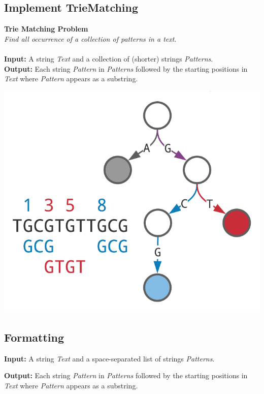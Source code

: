 \documentclass{article}
\begin{document}
\subsection{Implement TrieMatching}
\hline \vspace{5}
\textbf{Trie Matching Problem}\\
\emph{Find all occurrence of a collection of patterns in a text}.\\ \\
\textbf{Input:} A string \emph{Text} and a collection of (shorter) strings \emph{Patterns}.\\
\textbf{Output:} Each string \emph{Pattern} in \emph{Patterns} followed by the starting positions in \emph{Text} where \emph{Pattern} appears as a substring.
\begin{center}
    \includegraphics[scale=0.2]{c9/logos/9B.png} 
\end{center}
\hline \vspace{5}

\subsection*{Formatting}

\textbf{Input:} A string \emph{Text} and a space-separated list of strings \emph{Patterns}.

\noindent \textbf{Output:} Each string \emph{Pattern} in \emph{Patterns} followed by the starting positions in \emph{Text} where \emph{Pattern} appears as a substring.
\end{document}
